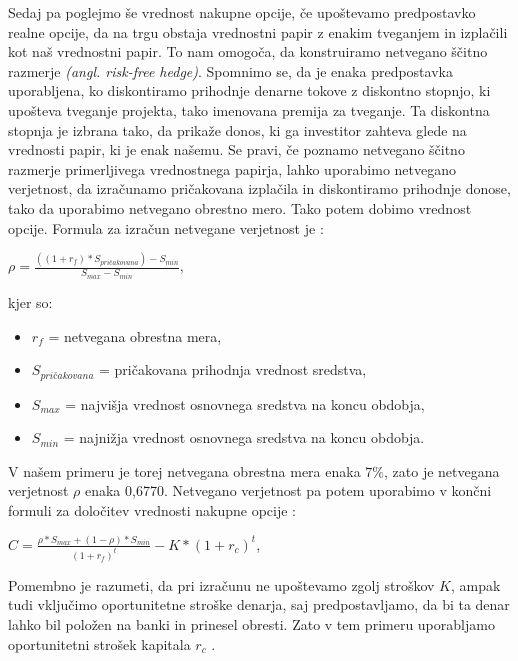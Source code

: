 Sedaj pa poglejmo še vrednost nakupne opcije, če upoštevamo predpostavko realne opcije, da na trgu obstaja vrednostni papir z enakim tveganjem in izplačili kot naš vrednostni papir. To nam omogoča, da konstruiramo netvegano ščitno razmerje \textit{(angl. risk-free hedge)}. Spomnimo se, da je enaka predpostavka uporabljena, ko diskontiramo prihodnje denarne tokove z diskontno stopnjo, ki upošteva tveganje projekta, tako imenovana premija za tveganje. Ta diskontna stopnja je izbrana tako, da prikaže donos, ki ga investitor zahteva glede na vrednosti papir, ki je enak našemu. Se pravi, če poznamo netvegano ščitno razmerje primerljivega vrednostnega papirja, lahko uporabimo netvegano verjetnost, da izračunamo pričakovana izplačila in diskontiramo prihodnje donose, tako da uporabimo netvegano obrestno mero. Tako potem dobimo vrednost opcije. Formula za izračun netvegane verjetnost je \cite[str. 53, 54]{Brach}:
\begin{center}
$\rho = \tfrac{((1+r_f) * S_{pričakovana}) - S_{min}}{S_{max} - S_{min}}$,
\end{center}
kjer so: \\
\begin{itemize}
\item $r_f$ = netvegana obrestna mera,
\item $S_{pričakovana}$ = pričakovana prihodnja vrednost sredstva,
\item $S_{max}$ = najvišja vrednost osnovnega sredstva na koncu obdobja,
\item $S_{min}$ = najnižja vrednost osnovnega sredstva na koncu obdobja.
\end{itemize}

V našem primeru je torej netvegana obrestna mera enaka $7 \%$, zato je netvegana verjetnost $\rho$ enaka 0,6770. Netvegano verjetnost pa potem uporabimo v končni formuli za določitev vrednosti nakupne opcije \cite[str. 54]{Brach}:
\begin{center}
$C = \tfrac{\rho * S_{max} + (1-\rho) * S_{min}}{(1+r_f)^t} - K *(1 +  r_c)^t$,
\end{center}
Pomembno je razumeti, da pri izračunu ne upoštevamo zgolj stroškov $K$, ampak tudi vključimo oportunitetne stroške denarja, saj predpostavljamo, da bi ta denar lahko bil položen na banki in prinesel obresti. Zato v tem primeru uporabljamo oportunitetni strošek kapitala $r_c$ \cite[str. 54]{Brach}.\\

